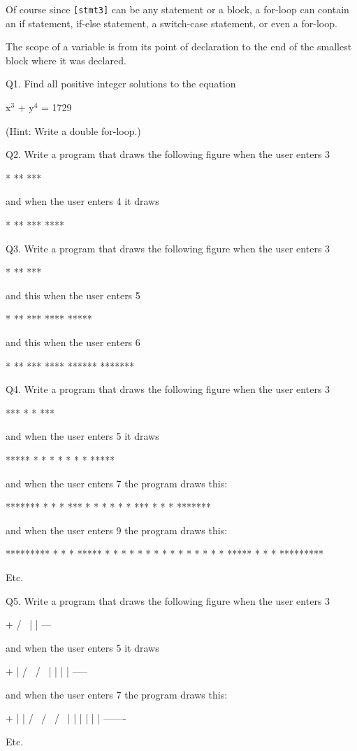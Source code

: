 \begin{console}
Of course since \texttt{[stmt3]} can be any statement or a block, a
for-loop can contain an if statement, if-else statement, a switch-case
statement, or even a for-loop.

The scope of a variable is from its point of declaration to the end of
the smallest block where it was declared.

\newpage{}

Q1. Find all positive integer solutions to the equation
\begin{center}
x$^{3}$ + y$^{4}$ = 1729
\end{center}
(Hint: Write a double for-loop.)

Q2. Write a program that draws the following figure when the user enters 3
\begin{console}
  *
 **
***
\end{console}
and when the user enters 4 it draws
\begin{console}
   *
  **
 ***
****
\end{console}
Q3. Write a program that draws the following figure when the user enters
3
\begin{console}
*
 **
***
\end{console}
and this when the user enters 5
\begin{console}
*
  **
***
 ****
*****
\end{console}
and this when the user enters 6
\begin{console}
*
     **
***
   ****
******
*******
\end{console}
Q4. Write a program that draws the following figure when the user enters
3
\begin{console}
***
* *
***
\end{console}
and when the user enters 5 it draws
\begin{console}
*****
*   *
* * *
*   *
*****
\end{console}
and when the user enters 7 the program draws this:
\begin{console}
*******
*     *
* *** *
* * * *
* *** *
*     *
*******
\end{console}
and when the user enters 9 the program draws this:
\begin{console}
*********
*       *
* ***** *
* *   * *
* * * * *
* *   * *
* ***** *
*       *
*********
\end{console}
Etc.

Q5. Write a program that draws the following figure when the user enters
3
\begin{console}
 +
/ \
| |
---
\end{console}
and when the user enters 5 it draws
\begin{console}
  +
 |
 / \
/   \
|   |
|   |
-----
\end{console}
and when the user enters 7 the program draws this:
\begin{console}
   +
   |
   |
  / \
 /   \
/     \          
|     |
|     |
|     |           
-------
\end{console}
Etc.


\end{console}
